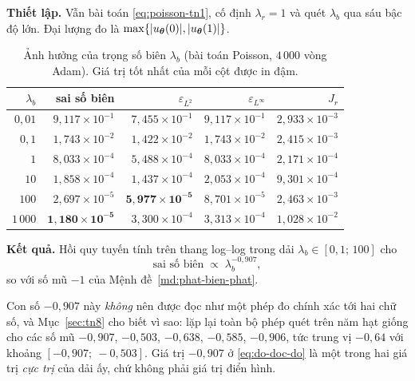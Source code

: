 \textbf{Thiết lập.} Vẫn bài toán \eqref{eq:poisson-tn1}, cố định
$\lambda_r = 1$ và quét $\lambda_b$ qua sáu bậc độ lớn. Đại lượng đo là
$\max\{\lvert u_{\bm{\theta}}(0)\rvert, \lvert u_{\bm{\theta}}(1)\rvert\}$.
 
\begin{table}[H]
\centering
\caption{Ảnh hưởng của trọng số biên $\lambda_b$ (bài toán Poisson, $4\,000$ vòng
Adam). Giá trị tốt nhất của mỗi cột được in đậm.}
\label{tab:tn2}
\small
\begin{tabular}{@{}rrrrr@{}}
\toprule
$\lambda_b$ & sai số biên & $\varepsilon_{L^2}$ & $\varepsilon_{L^{\infty}}$
& $J_r$ \\
\midrule
$0{,}01$ & $9{,}117\times10^{-1}$ & $7{,}455\times10^{-1}$
         & $9{,}117\times10^{-1}$ & $2{,}933\times10^{-3}$ \\
$0{,}1$  & $1{,}743\times10^{-2}$ & $1{,}422\times10^{-2}$
         & $1{,}743\times10^{-2}$ & $2{,}415\times10^{-3}$ \\
$1$      & $8{,}033\times10^{-4}$ & $5{,}488\times10^{-4}$
         & $8{,}033\times10^{-4}$ & $2{,}171\times10^{-4}$ \\
$10$     & $1{,}858\times10^{-4}$ & $1{,}437\times10^{-4}$
         & $2{,}053\times10^{-4}$ & $9{,}301\times10^{-4}$ \\
$100$    & $2{,}697\times10^{-5}$ & $\mathbf{5{,}977\times10^{-5}}$
         & $8{,}701\times10^{-5}$ & $2{,}463\times10^{-3}$ \\
$1\,000$ & $\mathbf{1{,}180\times10^{-5}}$ & $3{,}300\times10^{-4}$
         & $3{,}313\times10^{-4}$ & $1{,}028\times10^{-2}$ \\
\bottomrule
\end{tabular}
\end{table}
 
\textbf{Kết quả.} Hồi quy tuyến tính trên thang log--log trong dải
$\lambda_b \in [0{,}1;\,100]$ cho
\begin{equation}
\text{sai số biên} \;\propto\; \lambda_b^{-0{,}907},
\label{eq:do-doc-do}
\end{equation}
so với số mũ $-1$ của Mệnh đề~\ref{md:phat-bien-phat}.

Con số $-0{,}907$ này \emph{không} nên được đọc như một phép đo chính xác tới hai
chữ số, và Mục~\ref{sec:tn8} cho biết vì sao: lặp lại toàn bộ phép quét trên năm
hạt giống cho các số mũ $-0{,}907$, $-0{,}503$, $-0{,}638$, $-0{,}585$,
$-0{,}906$, tức trung vị $-0{,}64$ với khoảng $[-0{,}907;\ -0{,}503]$. Giá trị
$-0{,}907$ ở \eqref{eq:do-doc-do} là một trong hai giá trị \emph{cực trị} của
dải ấy, chứ không phải giá trị điển hình.


